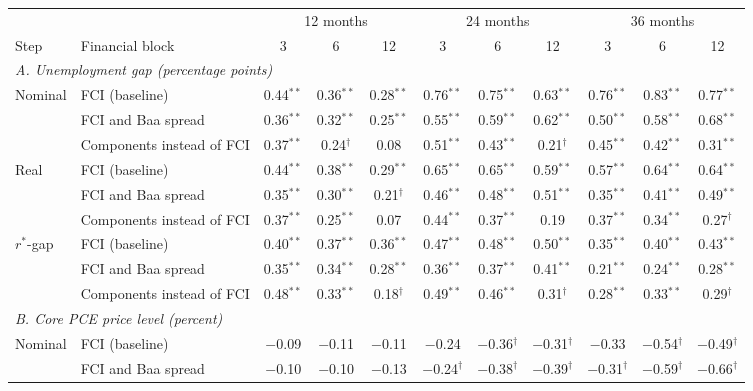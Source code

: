 \begin{tabular}{llccccccccc}
\toprule
 & & \multicolumn{3}{c}{12 months} & \multicolumn{3}{c}{24 months} & \multicolumn{3}{c}{36 months}\\
\cmidrule(lr){3-5}\cmidrule(lr){6-8}\cmidrule(lr){9-11}
Step & Financial block & 3 & 6 & 12 & 3 & 6 & 12 & 3 & 6 & 12 \\
\midrule
\multicolumn{11}{l}{\textit{A. Unemployment gap (percentage points)}}\\
Nominal & FCI (baseline) & 0.44$^{**}$ & 0.36$^{**}$ & 0.28$^{**}$ & 0.76$^{**}$ & 0.75$^{**}$ & 0.63$^{**}$ & 0.76$^{**}$ & 0.83$^{**}$ & 0.77$^{**}$ \\
 & FCI and Baa spread & 0.36$^{**}$ & 0.32$^{**}$ & 0.25$^{**}$ & 0.55$^{**}$ & 0.59$^{**}$ & 0.62$^{**}$ & 0.50$^{**}$ & 0.58$^{**}$ & 0.68$^{**}$ \\
 & Components instead of FCI & 0.37$^{**}$ & 0.24$^{\dagger}$ & 0.08 & 0.51$^{**}$ & 0.43$^{**}$ & 0.21$^{\dagger}$ & 0.45$^{**}$ & 0.42$^{**}$ & 0.31$^{**}$ \\
Real & FCI (baseline) & 0.44$^{**}$ & 0.38$^{**}$ & 0.29$^{**}$ & 0.65$^{**}$ & 0.65$^{**}$ & 0.59$^{**}$ & 0.57$^{**}$ & 0.64$^{**}$ & 0.64$^{**}$ \\
 & FCI and Baa spread & 0.35$^{**}$ & 0.30$^{**}$ & 0.21$^{\dagger}$ & 0.46$^{**}$ & 0.48$^{**}$ & 0.51$^{**}$ & 0.35$^{**}$ & 0.41$^{**}$ & 0.49$^{**}$ \\
 & Components instead of FCI & 0.37$^{**}$ & 0.25$^{**}$ & 0.07 & 0.44$^{**}$ & 0.37$^{**}$ & 0.19 & 0.37$^{**}$ & 0.34$^{**}$ & 0.27$^{\dagger}$ \\
$r^*$-gap & FCI (baseline) & 0.40$^{**}$ & 0.37$^{**}$ & 0.36$^{**}$ & 0.47$^{**}$ & 0.48$^{**}$ & 0.50$^{**}$ & 0.35$^{**}$ & 0.40$^{**}$ & 0.43$^{**}$ \\
 & FCI and Baa spread & 0.35$^{**}$ & 0.34$^{**}$ & 0.28$^{**}$ & 0.36$^{**}$ & 0.37$^{**}$ & 0.41$^{**}$ & 0.21$^{**}$ & 0.24$^{**}$ & 0.28$^{**}$ \\
 & Components instead of FCI & 0.48$^{**}$ & 0.33$^{**}$ & 0.18$^{\dagger}$ & 0.49$^{**}$ & 0.46$^{**}$ & 0.31$^{\dagger}$ & 0.28$^{**}$ & 0.33$^{**}$ & 0.29$^{\dagger}$ \\
\midrule
\multicolumn{11}{l}{\textit{B. Core PCE price level (percent)}}\\
Nominal & FCI (baseline) & $-$0.09 & $-$0.11 & $-$0.11 & $-$0.24 & $-$0.36$^{\dagger}$ & $-$0.31$^{\dagger}$ & $-$0.33 & $-$0.54$^{\dagger}$ & $-$0.49$^{\dagger}$ \\
 & FCI and Baa spread & $-$0.10 & $-$0.10 & $-$0.13 & $-$0.24$^{\dagger}$ & $-$0.38$^{\dagger}$ & $-$0.39$^{\dagger}$ & $-$0.31$^{\dagger}$ & $-$0.59$^{\dagger}$ & $-$0.66$^{\dagger}$ \\

\end{tabular}
